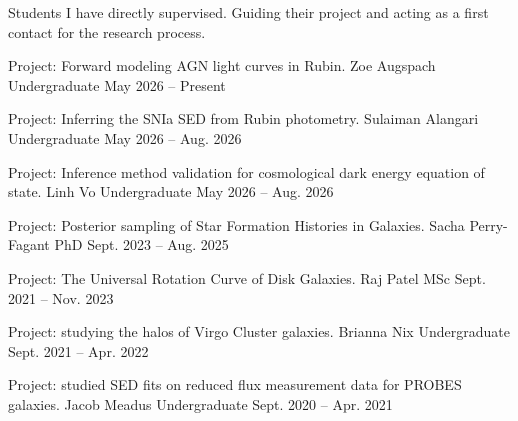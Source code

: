 

Students I have directly supervised. Guiding their project and acting as a first contact for the research process. \\ 

\begin{cventries}

  \cventry
    {Project: Forward modeling AGN light curves in Rubin.} %
    {Zoe Augspach} %
    {Undergraduate} %
    {May 2026 – Present} %

  \cventry
    {Project: Inferring the SNIa SED from Rubin photometry.} %
    {Sulaiman Alangari} %
    {Undergraduate} %
    {May 2026 – Aug. 2026} %

  \cventry
    {Project: Inference method validation for cosmological dark energy equation of state.} %
    {Linh Vo} %
    {Undergraduate} %
    {May 2026 – Aug. 2026} %

  \cventry
    {Project: Posterior sampling of Star Formation Histories in Galaxies.} %
    {Sacha Perry-Fagant} %
    {PhD} %
    {Sept. 2023 – Aug. 2025} %
    
  \cventry
    {Project: The Universal Rotation Curve of Disk Galaxies.} %
    {Raj Patel} %
    {MSc} %
    {Sept. 2021 – Nov. 2023} %

  \cventry
    {Project: studying the halos of Virgo Cluster galaxies.} %
    {Brianna Nix} %
    {Undergraduate} %
    {Sept. 2021 – Apr. 2022} %

  \cventry
    {Project: studied SED fits on reduced flux measurement data for PROBES galaxies.} %
    {Jacob Meadus} %
    {Undergraduate} %
    {Sept. 2020 – Apr. 2021} %


\end{cventries}
